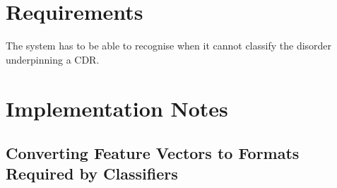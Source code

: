 \documentclass[a4paper,fleqn]{article}
\begin{document}
\section{Requirements}

The system has to be able to recognise when it cannot classify the
disorder underpinning a CDR.


\section{Implementation Notes}

\subsection{Converting Feature Vectors to Formats Required by
  Classifiers}
\end{document}
